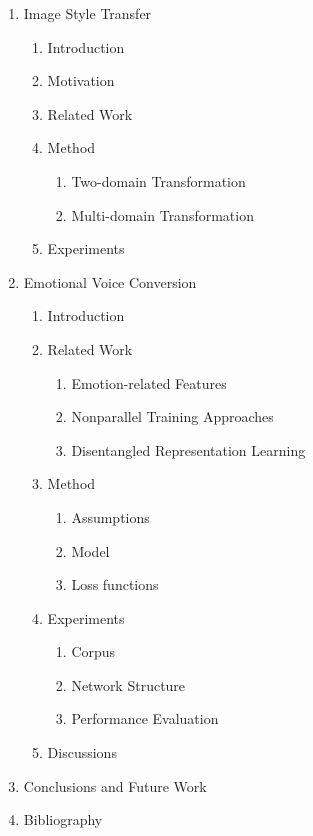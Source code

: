 \documentclass{article}
\begin{document}
\begin{enumerate}
    \item Image Style Transfer
    \begin{enumerate}
    	\item Introduction
        \item Motivation
        \item Related Work
        \item Method
        \begin{enumerate}
          \item Two-domain Transformation
          \item Multi-domain Transformation
        \end{enumerate}
        \item Experiments
    \end{enumerate}

    \item Emotional Voice Conversion
    \begin{enumerate}
    	\item Introduction
        \item Related Work
        \begin{enumerate}
            \item Emotion-related Features
            \item Nonparallel Training Approaches
            \item Disentangled Representation Learning
        \end{enumerate}

        \item Method
        \begin{enumerate}
          \item Assumptions
          \item Model
          \item Loss functions
        \end{enumerate}
        \item Experiments
        \begin{enumerate}
          \item Corpus
          \item Network Structure
          \item Performance Evaluation
        \end{enumerate}
        \item Discussions
    \end{enumerate}

    \item Conclusions and Future Work
    \item[] Bibliography
\end{enumerate}
\end{document}
